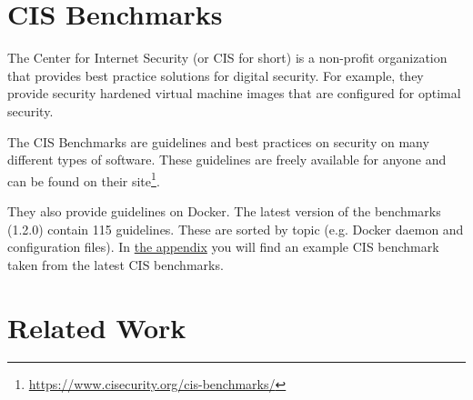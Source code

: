\section{CIS Benchmarks}
The Center for Internet Security (or CIS for short) is a non-profit organization that provides best practice solutions for digital security. For example, they provide security hardened virtual machine images that are configured for optimal security.

\hfill

The CIS Benchmarks are guidelines and best practices on security on many different types of software. These guidelines are freely available for anyone and can be found on their site\footnote{\url{https://www.cisecurity.org/cis-benchmarks/}}.

\hfill

They also provide guidelines on Docker\cite{cis}. The latest version of the benchmarks (1.2.0) contain 115 guidelines. These are sorted by topic (e.g. Docker daemon and configuration files). In \hyperref[appendix:a]{the appendix} you will find an example CIS benchmark taken from the latest CIS benchmarks.

\section{Related Work}
